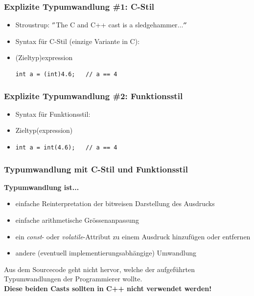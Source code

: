 \begin{minipage}{0.45\linewidth}
\subsubsection{Explizite Typumwandlung \#1: C-Stil}
\begin{itemize}
	\item Stroustrup: $"$The C and C++ cast is a sledgehammer...$"$
	\item Syntax für C-Stil (einzige Variante in C):
	\item[\-](Zieltyp)expression
\vspace{-\baselineskip}
\begin{minipage}{\linewidth}
\begin{lstlisting}
int a = (int)4.6;	// a == 4
\end{lstlisting}
\end{minipage}
\end{itemize}
\end{minipage}
\hspace{0.05\linewidth}
\begin{minipage}{0.45\linewidth}
\subsubsection{Explizite Typumwandlung \#2: Funktionsstil}
\begin{itemize}
	\item Syntax für Funktionsstil:
	\item[\-] Zieltyp(expression)
	\item[\-]
\vspace{-\baselineskip}
\begin{minipage}{\linewidth}
\begin{lstlisting}
int a = int(4.6);	// a == 4
\end{lstlisting}
\end{minipage}
\end{itemize}
\end{minipage}

\subsubsection{Typumwandlung mit C-Stil und Funktionsstil}
\textbf{Typumwandlung ist...}
\begin{itemize}
	\item einfache Reinterpretation der bitweisen Darstellung des Ausdrucks
	\item einfache arithmetische Grössenanpassung
	\item ein \emph{const}- oder \emph{volatile}-Attribut zu einem Ausdruck hinzufügen oder entfernen
	\item andere (eventuell implementierungsabhängige) Umwandlung
\end{itemize}
\begin{achtung}
Aus dem Sourcecode geht nicht hervor, welche der aufgeführten Typumwandlungen der Programmierer wollte.\\ 
\textbf{Diese beiden Casts sollten in C++ nicht verwendet werden!}
\end{achtung}
\pagebreak\newpage


